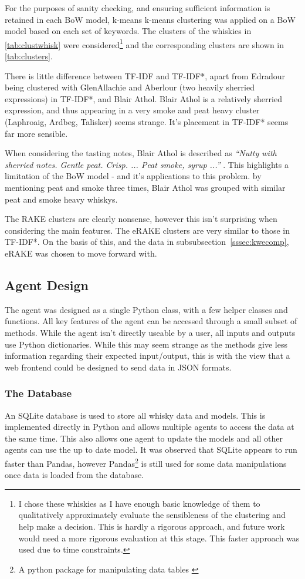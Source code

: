 For the purposes of sanity checking, and ensuring sufficient information is retained in each BoW model, k-means
k-means clustering was applied on a BoW model based on each set of keywords. The clusters of the whiskies in 
\autoref{tab:clustwhisk} were considered\footnote{I chose these whiskies as I have enough basic knowledge of 
them to qualitatively approximately evaluate the sensibleness of the clustering and help make a decision. This 
is hardly a rigorous approach, and future work would need a more rigorous evaluation at this stage.  This faster
approach was used due to time constraints.} and the corresponding clusters are shown in \autoref{tab:clusters}.

There is little difference between TF-IDF and TF-IDF*, apart from Edradour being clustered with GlenAllachie and Aberlour 
(two heavily sherried expressions) in TF-IDF*, and Blair Athol.  Blair Athol is a relatively sherried expression,
and thus appearing in a very smoke and peat heavy cluster (Laphroaig, Ardbeg, Talisker) seems strange. It's placement in 
TF-IDF* seems far more sensible.

When considering the tasting notes, Blair Athol is described as 
\emph{``Nutty with sherried notes. Gentle peat. Crisp. ... Peat smoke, syrup ...''} \cite{mom_ba}.  This highlights a limitation
of the BoW model - and it's applications to this problem. by mentioning peat and smoke three times, Blair Athol was grouped
with similar peat and smoke heavy whiskys.

The RAKE clusters are clearly nonsense, however this isn't surprising when considering the main features. The eRAKE clusters
are very similar to those in TF-IDF*.  On the basis of this, and the data in subsubsection~\ref{sssec:kwecomp}, eRAKE was chosen to move forward with.

\subsection{Agent Design}\label{ssec:phase2}
The agent was designed as a single Python class, with a few helper classes and functions.  All key features
of the agent can be accessed through a small subset of methods. While the agent isn't directly useable by a user,
all inputs and outputs use Python dictionaries.  While this may seem strange as the methods give less information
regarding their expected input/output, this is with the view that a web frontend could be designed to send
data in JSON formats.

\subsubsection{The Database}\label{sssec:db}
An SQLite database is used to store all whisky data and models.  This is implemented directly in Python and
allows multiple agents to access the data at the same time.  This also allows one agent to update the models
and all other agents can use the up to date model.  It was observed that SQLite appears to run faster than Pandas,
however Pandas\footnote{A python package for manipulating data tables \cite{reback2020pandas}} is still used 
for some data manipulations once data is loaded from the database.

